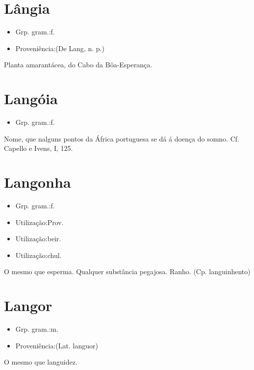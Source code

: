 \section{Lângia}
\begin{itemize}
\item {Grp. gram.:f.}
\end{itemize}
\begin{itemize}
\item {Proveniência:(De \textunderscore Lang\textunderscore , n. p.)}
\end{itemize}
Planta amarantácea, do Cabo da Bôa-Esperança.
\section{Langóia}
\begin{itemize}
\item {Grp. gram.:f.}
\end{itemize}
Nome, que nalguns pontos da África portuguesa se dá á doença do somno. Cf. Capello e Ivens, I, 125.
\section{Langonha}
\begin{itemize}
\item {Grp. gram.:f.}
\end{itemize}
\begin{itemize}
\item {Utilização:Prov.}
\end{itemize}
\begin{itemize}
\item {Utilização:beir.}
\end{itemize}
\begin{itemize}
\item {Utilização:chul.}
\end{itemize}
O mesmo que \textunderscore esperma\textunderscore .
Qualquer substância pegajosa.
Ranho.
(Cp. \textunderscore languinhento\textunderscore )
\section{Langor}
\begin{itemize}
\item {Grp. gram.:m.}
\end{itemize}
\begin{itemize}
\item {Proveniência:(Lat. \textunderscore languor\textunderscore )}
\end{itemize}
O mesmo que \textunderscore languidez\textunderscore .
